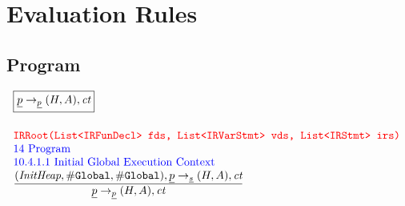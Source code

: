 

\newpage
\section{Evaluation Rules}

\subsection{Program}

\[
\begin{array}{l@{~~}l@{~~}ll}
\fbox{$\ir{p} \rightarrow_{\ir{p}} \res,\ct$}\\[2em]
\mtt{\normalsize\inred IRRoot(List<IRFunDecl> fds, List<IRVarStmt> vds, List<IRStmt> irs)}\\
\mbox{\inblue 14 Program}\\
\mbox{\inblue 10.4.1.1 Initial Global Execution Context}\\
\frac{\begin{matrix}
(\emph{InitHeap}, \lg, \lg), \ir{p} \rightarrow_{\ir{\stmt}} \res,\ct
\end{matrix}}{\begin{matrix}
\ir{p} \rightarrow_{\ir{p}} \res,\ct
\end{matrix}}
\\[1em]
\end{array}
\]

